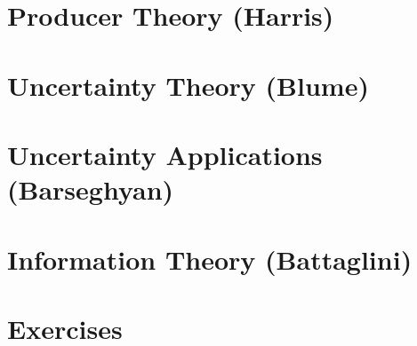 \documentclass[12pt]{article}
\begin{document}
\newpage
\section{Producer Theory (Harris)}\label{sec:harris}

\newpage
\section{Uncertainty Theory (Blume)}\label{sec:blume}

\newpage
\section{Uncertainty Applications (Barseghyan)}\label{sec:barseghyan}

\newpage
\section{Information Theory (Battaglini)}\label{sec:battaglini}

\newpage
\section{Exercises}\label{sec:exercises}
\end{document}
